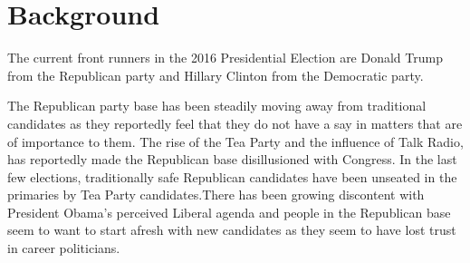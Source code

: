 \documentclass{sig-alternate-05-2015}
\begin{document}
%
\author{
%
%
\alignauthor
Gopal Menon\\
       \\
       \\
       \\
}



\maketitle


%
%



%
%

%
%


\section{Background}
The current front runners in the 2016 Presidential Election are Donald Trump from the Republican party and Hillary Clinton from the Democratic party. 

The Republican party base has been steadily moving away from traditional candidates as they reportedly feel that they do not have a say in matters that are of importance to them. The rise of the Tea Party and the influence of Talk Radio, has reportedly made the Republican base disillusioned with Congress. In the last few elections, traditionally safe Republican candidates have been unseated in the primaries by Tea Party candidates.There has been growing discontent with President Obama's perceived Liberal agenda and people in the Republican base seem to want to start afresh with new candidates as they seem to have lost trust in career politicians.
\end{document}

